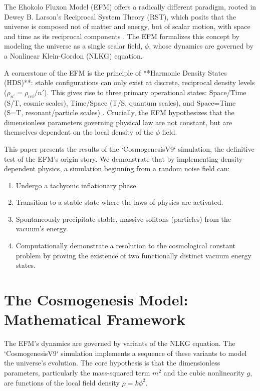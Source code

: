 \documentclass[11pt, twoside]{article}
\begin{document}
The Ehokolo Fluxon Model (EFM) offers a radically different paradigm, rooted in Dewey B. Larson's Reciprocal System Theory (RST), which posits that the universe is composed not of matter and energy, but of scalar motion, with space and time as its reciprocal components \citep{larson1959}. The EFM formalizes this concept by modeling the universe as a single scalar field, \(\phi\), whose dynamics are governed by a Nonlinear Klein-Gordon (NLKG) equation.

A cornerstone of the EFM is the principle of **Harmonic Density States (HDS)**: stable configurations can only exist at discrete, reciprocal density levels (\(\rho_{n'} = \rho_{\text{ref}}/n'\)). This gives rise to three primary operational states: Space/Time (S/T, cosmic scales), Time/Space (T/S, quantum scales), and Space=Time (S=T, resonant/particle scales) \citep{emvula2025compendium}. Crucially, the EFM hypothesizes that the dimensionless parameters governing physical law are not constant, but are themselves dependent on the local density of the \(\phi\) field.

This paper presents the results of the `CosmogenesisV9` simulation, the definitive test of the EFM's origin story. We demonstrate that by implementing density-dependent physics, a simulation beginning from a random noise field can:
\begin{enumerate}
    \item Undergo a tachyonic inflationary phase.
    \item Transition to a stable state where the laws of physics are activated.
    \item Spontaneously precipitate stable, massive solitons (particles) from the vacuum's energy.
    \item Computationally demonstrate a resolution to the cosmological constant problem by proving the existence of two functionally distinct vacuum energy states.
\end{enumerate}

\section{The Cosmogenesis Model: Mathematical Framework}
The EFM's dynamics are governed by variants of the NLKG equation. The `CosmogenesisV9` simulation implements a sequence of these variants to model the universe's evolution. The core hypothesis is that the dimensionless parameters, particularly the mass-squared term \(m^2\) and the cubic nonlinearity \(g\), are functions of the local field density \(\rho = k\phi^2\).
\end{document}
